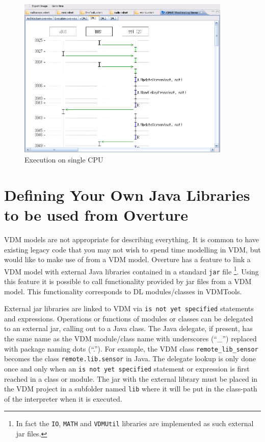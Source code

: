 \documentclass{overturerepchap}
\begin{document}
\begin{figure}[htp]
\begin{center}
  \includegraphics[width=4in]{figures/ExecutionCPU}
  \caption{Execution on single CPU}
  \label{fig:userguide:ExecutionCPU}
\end{center}
\end{figure}

\chapter{Defining Your Own Java Libraries to be used from Overture}\label{sec:javalibs}

VDM models are not appropriate for describing everything. It is common
to have existing legacy code that you may not
wish to spend time modelling in VDM, but would like to make use of
from a VDM model. Overture has a feature to link a VDM
model with external Java libraries contained in a standard \texttt{jar} file
\footnote{In fact the \texttt{IO}, \texttt{MATH} and \texttt{VDMUtil} libraries are implemented as such
external jar files.}.
Using this feature it is possible 
to call functionality provided by jar files from a VDM model. This functionality
corresponds to DL modules/classes in VDMTools\cite{DLMan}.

External jar libraries are linked to VDM via
\texttt{is not yet specified} statements and expressions. Operations
or functions of modules or classes can be delegated to an external
jar, calling out to a Java class. The Java delegate, if present, has
the same name as the VDM
module/class name with underscores (``\_'') replaced with package naming
dots (``.''). For example, the VDM class \texttt{remote\_lib\_sensor} becomes
the class \texttt{remote.lib.sensor} in Java. The delegate lookup is only done once and
only when an \texttt{is not yet specified} statement or expression is first
reached in a class or module. The jar with the external library must be placed in
the VDM project in a subfolder named \texttt{lib} where it will be put in the
class-path of the interpreter when it is executed.
\end{document}
